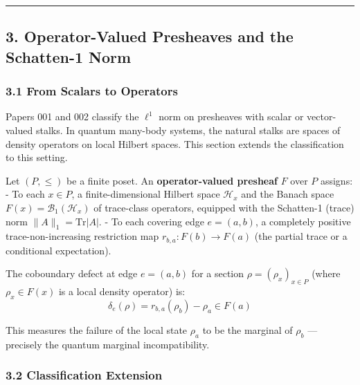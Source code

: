 \documentclass[
]{article}
\begin{document}
\begin{center}\rule{0.5\linewidth}{0.5pt}\end{center}

\subsection{3. Operator-Valued Presheaves and the Schatten-1
Norm}\label{operator-valued-presheaves-and-the-schatten-1-norm}

\subsubsection{3.1 From Scalars to
Operators}\label{from-scalars-to-operators}

Papers 001 and 002 classify the \(\ell^1\) norm on presheaves with
scalar or vector-valued stalks. In quantum many-body systems, the
natural stalks are spaces of density operators on local Hilbert spaces.
This section extends the classification to this setting.

Let \((P, \leq)\) be a finite poset. An \textbf{operator-valued
presheaf} \(F\) over \(P\) assigns: - To each \(x \in P\), a
finite-dimensional Hilbert space \(\mathcal{H}_x\) and the Banach space
\(F(x) = \mathcal{B}_1(\mathcal{H}_x)\) of trace-class operators,
equipped with the Schatten-1 (trace) norm \(\|A\|_1 = \mathrm{Tr}|A|\).
- To each covering edge \(e = (a, b)\), a completely positive
trace-non-increasing restriction map \(r_{b,a}: F(b) \to F(a)\) (the
partial trace or a conditional expectation).

The coboundary defect at edge \(e = (a, b)\) for a section
\(\rho = (\rho_x)_{x \in P}\) (where \(\rho_x \in F(x)\) is a local
density operator) is:
\[\delta_e(\rho) = r_{b,a}(\rho_b) - \rho_a \in F(a)\]

This measures the failure of the local state \(\rho_a\) to be the
marginal of \(\rho_b\) --- precisely the quantum marginal
incompatibility.

\subsubsection{3.2 Classification
Extension}\label{classification-extension}
\end{document}
